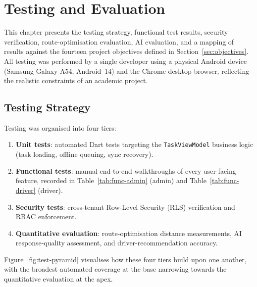 ﻿%
\chapter{Testing and Evaluation}
\label{ch:testing}

This chapter presents the testing strategy, functional test results, security
verification, route-optimisation evaluation, AI evaluation, and a mapping of
results against the fourteen project objectives defined in
Section~\ref{sec:objectives}.  All testing was performed by a single developer
using a physical Android device (Samsung Galaxy A54, Android~14) and the Chrome
desktop browser, reflecting the realistic constraints of an academic project.

\section{Testing Strategy}
\label{sec:test-strategy}

Testing was organised into four tiers:

\begin{enumerate}
  \item \textbf{Unit tests}: automated Dart tests targeting the
        \texttt{TaskViewModel} business logic (task loading, offline queuing,
        sync recovery).
  \item \textbf{Functional tests}: manual end-to-end walkthroughs of every
        user-facing feature, recorded in Table~\ref{tab:func-admin} (admin)
        and Table~\ref{tab:func-driver} (driver).
  \item \textbf{Security tests}: cross-tenant Row-Level Security (RLS)
        verification and RBAC enforcement.
  \item \textbf{Quantitative evaluation}: route-optimisation distance
        measurements, AI response-quality assessment, and driver-recommendation
        accuracy.
\end{enumerate}

\noindent Figure~\ref{fig:test-pyramid} visualises how these four tiers build
upon one another, with the broadest automated coverage at the base narrowing
towards the quantitative evaluation at the apex.

